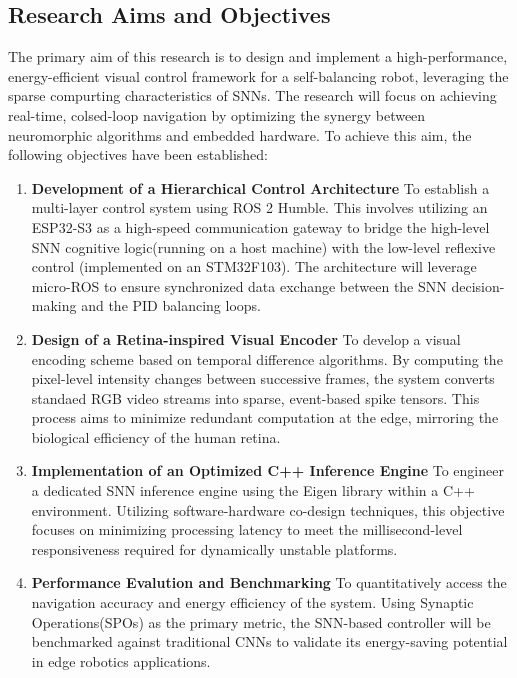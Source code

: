 \subsection{Research Aims and Objectives}
The primary aim of this research is to design and implement a high-performance,
energy-efficient visual control framework for a self-balancing robot, leveraging the sparse compurting
characteristics of SNNs. The research will focus on achieving real-time, colsed-loop
navigation by optimizing the synergy between neuromorphic algorithms and embedded hardware.
To achieve this aim, the following objectives have been established:
\begin{enumerate}[label=\textbf{Objective \arabic*:}, leftmargin=*]
    \item \textbf{Development of a Hierarchical Control Architecture}\newline
    To establish a multi-layer control system using ROS 2 Humble. This involves
    utilizing an ESP32-S3 as a high-speed communication gateway to bridge the high-level
    SNN cognitive logic(running on a host machine) with the low-level reflexive control
    (implemented on an STM32F103). The architecture will leverage micro-ROS to ensure 
    synchronized data exchange between the SNN decision-making and the PID balancing loops.
    
    
    \item \textbf{Design of a Retina-inspired Visual Encoder}\newline
    To develop a visual encoding scheme based on temporal difference algorithms. 
    By computing the pixel-level intensity changes between successive frames,
    the system converts standaed RGB video streams into sparse, event-based spike
    tensors. This process aims to minimize redundant computation at the edge, mirroring
    the biological efficiency of the human retina.
    
    \item \textbf{Implementation of an Optimized C++ Inference Engine}\newline
    To engineer a dedicated SNN inference engine using the Eigen library within a C++
    environment. Utilizing software-hardware co-design techniques, this objective 
    focuses on minimizing processing latency to meet the millisecond-level responsiveness
    required for dynamically unstable platforms.

    \item \textbf{Performance Evalution and Benchmarking}\newline
    To quantitatively access the navigation accuracy and energy efficiency of the system.
    Using Synaptic Operations(SPOs) as the primary metric, the SNN-based controller will
    be benchmarked against traditional CNNs to validate its energy-saving potential
    in edge robotics applications.
\end{enumerate}


